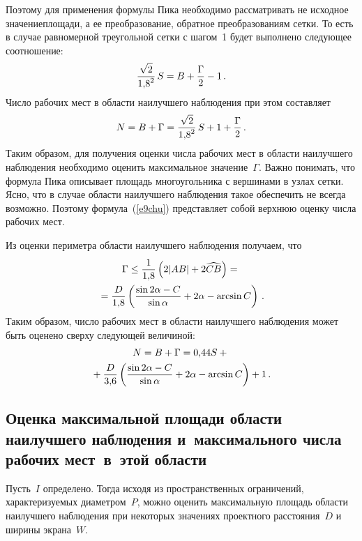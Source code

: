 \begin{multicols}{2}
Поэтому для применения формулы Пика необходимо рассматривать не 
исходное значение\linebreak площади, а ее преобразование, обратное преобразованиям 
сетки. То есть в случае равномерной треугольной сетки с шагом~1 будет 
выполнено следующее соотношение:
\begin{equation}
\displaystyle\frac{\displaystyle \sqrt{2}\mathstrut}{\displaystyle 1{,}8^2\mathstrut}\,S=B+\displaystyle\frac{\displaystyle \Gamma\mathstrut}{\displaystyle 2\mathstrut}-1\,.
\label{e8chu}
\end{equation}
Число рабочих мест в области наилучшего наблюдения при этом составляет
\begin{equation}
N=B+\Gamma=\displaystyle\frac{\displaystyle \sqrt{2}\mathstrut}{\displaystyle 1{,}8^2\mathstrut}\,S+1+\displaystyle\frac{\displaystyle \Gamma\mathstrut}{\displaystyle 2\mathstrut}\,.
\label{e9chu}
\end{equation}
Таким образом, для получения оценки числа рабочих мест в области 
наилучшего наблюдения необходимо оценить максимальное 
значение~$\Gamma$. Важно понимать, что формула Пика описывает 
площадь многоугольника с вершинами в узлах сетки. Ясно, что в случае 
области наилучшего наблюдения такое обеспечить не всегда возможно. 
Поэтому формула~(\ref{e9chu}) представляет собой верхнюю оценку  
числа рабочих мест.

Из оценки периметра области наилучшего наблюдения получаем, что
\begin{multline*}
\Gamma\leq \displaystyle\frac{\displaystyle 1\mathstrut}{\displaystyle 1{,}8\mathstrut}\left(2\vert AB\vert 
+2\widehat{CB}\right)={}\\
{}=\displaystyle\frac{\displaystyle D\mathstrut}{\displaystyle 1{,}8\mathstrut}\left(\displaystyle\frac{\displaystyle \sin2\alpha-C\mathstrut}{\displaystyle \sin\alpha\mathstrut}+2\alpha-
\arcsin C\right)\,.
\end{multline*}
Таким образом, число рабочих мест в области наилучшего наблюдения 
может быть оценено сверху следующей величиной:
\begin{multline}
N=B+\Gamma=0{,}44S+{}\\
{}+\displaystyle\frac{\displaystyle D\mathstrut}{\displaystyle 3{,}6\mathstrut}\left( \displaystyle\frac{\displaystyle \sin2\alpha-C\mathstrut}{\displaystyle \sin\alpha\mathstrut}+2\alpha-
\arcsin C\right)+1\,.
\label{e11chu}
\end{multline}

\subsection{Оценка максимальной площади области наилучшего 
наблюдения и~максимального числа рабочих мест~в~этой области}

Пусть~$I$ определено. Тогда исходя из пространственных ограничений, 
характеризуемых диа\-мет\-ром~$P$, можно оценить максимальную площадь 
области наилучшего наблюдения при некоторых значениях проектного 
расстояния~$D$ и ширины экрана~$W$.


\end{multicols}
